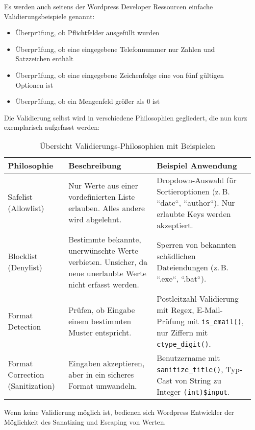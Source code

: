 Es werden auch seitens der Wordpress Developer Ressourcen einfache Validierungsbeispiele genannt:
\begin{itemize}
\item Überprüfung, ob Pflichtfelder ausgefüllt wurden
\item Überprüfung, ob eine eingegebene Telefonnummer nur Zahlen und Satzzeichen enthält
\item Überprüfung, ob eine eingegebene Zeichenfolge eine von fünf gültigen Optionen ist
\item Überprüfung, ob ein Mengenfeld größer als 0 ist
\end{itemize}
Die Validierung selbst wird in verschiedene Philosophien gegliedert, die nun kurz exemplarisch aufgefasst werden:
\begin{table}[h]
 \centering
 \renewcommand{\arraystretch}{1.3}
 \begin{tabular}{|p{3cm}|p{5cm}|p{6cm}|}
  \hline
  \textbf{Philosophie} & \textbf{Beschreibung} & \textbf{Beispiel Anwendung} \\
  \hline
  Safelist \newline (Allowlist)
  & Nur Werte aus einer vordefinierten Liste erlauben. Alles andere wird abgelehnt.
  & Dropdown-Auswahl für Sortieroptionen (z.\,B. ``date``, ``author``). Nur erlaubte Keys werden akzeptiert. \\
  \hline
  Blocklist \newline (Denylist)
  & Bestimmte bekannte, unerwünschte Werte verbieten. Unsicher, da neue unerlaubte Werte nicht erfasst werden.
  & Sperren von bekannten schädlichen Dateiendungen (z.\,B. ``.exe``, ``.bat``). \\
  \hline
  Format Detection
  & Prüfen, ob Eingabe einem bestimmten Muster entspricht.
  & Postleitzahl-Validierung mit Regex, E-Mail-Prüfung mit \texttt{is\_email()}, nur Ziffern mit \texttt{ctype\_digit()}. \\
  \hline
  Format Correction (Sanitization)
  & Eingaben akzeptieren, aber in ein sicheres Format umwandeln.
  & Benutzername mit  \newline \texttt{sanitize\_title()}, Typ-Cast von String zu Integer \texttt{(int)\$input}. \\
  \hline
 \end{tabular}
 \caption{Übersicht Validierungs-Philosophien mit Beispielen}
\end{table}

\newpage
Wenn keine Validierung möglich ist, bedienen sich Wordpress Entwickler der Möglichkeit des Sanatizing und Escaping von Werten.

